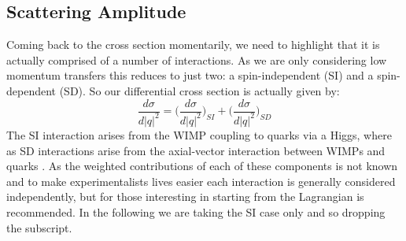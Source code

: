 \subsection{Scattering Amplitude}
\par
Coming back to the cross section momentarily, we need to highlight that it is actually comprised of a number of interactions.
As we are only considering low momentum transfers this reduces to just two: a spin-independent (SI) and a spin-dependent (SD).
So our differential cross section is actually given by:
\begin{equation}
    \frac{d\sigma}{d|q|^2} = \bigg(\frac{d\sigma}{d|q|^2}\bigg)_{SI} + \bigg(\frac{d\sigma}{d|q|^2}\bigg)_{SD}
\end{equation}
The SI interaction arises from the WIMP coupling to quarks via a Higgs, where as SD interactions arise from the axial-vector interaction between WIMPs and quarks \cite{supersymmetric_dark_matter_ref}.
As the weighted contributions of each of these components is not known and to make experimentalists lives easier each interaction is generally considered independently, but for those interesting in starting from the Lagrangian \cite{wimp_lagrangian_ref} is recommended.
In the following we are taking the SI case only and so dropping the subscript.

